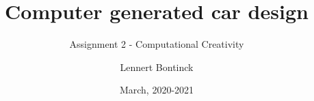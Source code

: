 \title{Computer generated car design}
\subtitle{Assignment 2 - Computational Creativity}
\author{Lennert Bontinck}
\date{March, 2020-2021}
